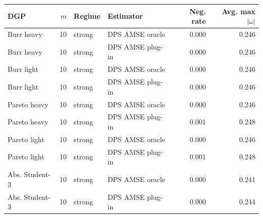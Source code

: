 \begin{tabular}{lrllrr}
\toprule
DGP & $m$ & Regime & Estimator & Neg. rate & Avg. max $|\omega|$ \\
\midrule
Burr heavy & 10 & strong & DPS AMSE oracle & 0.000 & 0.246 \\
Burr heavy & 10 & strong & DPS AMSE plug-in & 0.000 & 0.246 \\
Burr light & 10 & strong & DPS AMSE oracle & 0.000 & 0.246 \\
Burr light & 10 & strong & DPS AMSE plug-in & 0.000 & 0.246 \\
Pareto heavy & 10 & strong & DPS AMSE oracle & 0.000 & 0.246 \\
Pareto heavy & 10 & strong & DPS AMSE plug-in & 0.001 & 0.248 \\
Pareto light & 10 & strong & DPS AMSE oracle & 0.000 & 0.246 \\
Pareto light & 10 & strong & DPS AMSE plug-in & 0.001 & 0.248 \\
Abs. Student-3 & 10 & strong & DPS AMSE oracle & 0.000 & 0.241 \\
Abs. Student-3 & 10 & strong & DPS AMSE plug-in & 0.000 & 0.244 \\
\bottomrule
\end{tabular}
